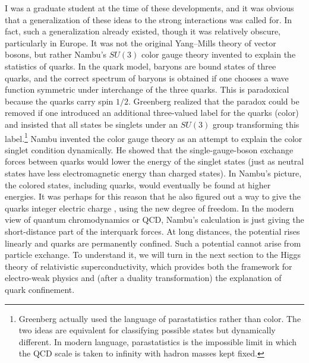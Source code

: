 I was a graduate student at the time of these developments, and it was obvious
that a generalization of these ideas to the strong interactions was called for.
In fact, such a generalization already existed, though it was relatively
obscure, particularly in Europe. It was not the original Yang--Mills theory of
vector bosons, but rather Nambu's $SU(3)$ color gauge theory \cite{banks-ref-79} invented to
explain the statistics of quarks. In the quark model, baryons are bound states
of three quarks, and the correct spectrum of baryons is obtained if one chooses
a wave function symmetric under interchange of the three quarks. This is
paradoxical because the quarks carry spin $1/2$. Greenberg \cite{banks-ref-80} realized that
the paradox could be removed if one introduced an additional three-valued label
for the quarks (color) and insisted that all states be singlets under an $SU(3)$
group transforming this label.\footnote[6]{Greenberg actually used the language
of parastatistics rather than color. The two ideas are equivalent for classifying
possible states but dynamically different. In modern language, parastatistics is
the impossible limit in which the QCD scale is taken to infinity with hadron
masses kept fixed.} Nambu \cite{banks-ref-79} invented the color gauge theory as an attempt to
explain the color singlet condition dynamically. He showed that the
single-gauge-boson exchange forces between quarks would lower the energy of the
singlet states (just as neutral states have less electromagnetic energy than
charged states). In Nambu's picture, the colored states, including quarks, would
eventually be found at higher energies. It was perhaps for this reason that he
also figured out a way to give the quarks integer electric charge \cite{banks-ref-81}, using
the new degree of freedom. In the modern view of quantum chromodynamics or QCD,
Nambu's calculation is just giving the short-distance part of the interquark
forces. At long distances, the potential rises linearly and quarks are
permanently confined. Such a potential cannot arise from particle exchange. To
understand it, we will turn in the next section to the Higgs theory of
relativistic superconductivity, which provides both the framework for
electro-weak physics and (after a duality transformation) the explanation of
quark confinement.
